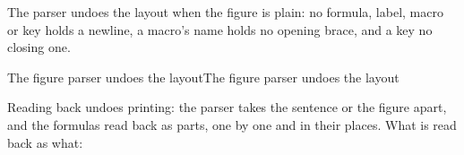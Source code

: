 \documentclass[acmsmall,screen,review,anonymous,nonacm]{acmart}
\begin{document}
The parser undoes the layout when the figure is plain: no formula, label,
macro or key holds a newline, a macro's name holds no opening brace, and
a key no closing one.

\begin{leantheorem}[sum=1-X1fCucqb]{The figure parser undoes the layout}{The figure parser undoes the layout}
\label{thm:The-figure-parser-undoes-the-layout}
\end{leantheorem}

Reading back undoes printing: the parser takes the sentence or the figure
apart, and the formulas read back as parts, one by one and in their
places. What is read back as what:
\end{document}
